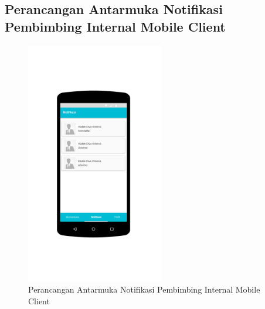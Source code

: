 \subsection{Perancangan Antarmuka Notifikasi Pembimbing Internal Mobile Client }
	\begin{figure}[H]
		\includegraphics[width=6cm]{figures/diagram/image134.png}
		\centering
		\caption{Perancangan Antarmuka Notifikasi Pembimbing Internal Mobile Client}
	\end{figure} 